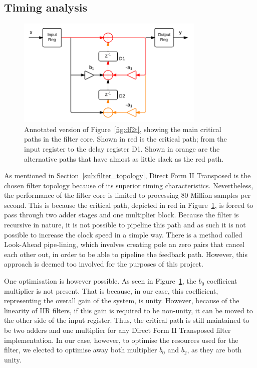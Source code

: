 \documentclass[]{article}
\begin{document}
\subsection{Timing analysis} %
\label{sub:timing_analysis}

\begin{figure}[tbp]
	\begin{center}
		\includegraphics[width = 0.8\textwidth]{DirectFormIITransposedCritpath.pdf}
	\end{center}
	\caption{Annotated version of Figure~\ref{fig:df2t}, showing the main critical paths in the filter core. Shown in red is the critical path; from the input register to the delay register D1. Shown in orange are the alternative paths that have almost as little slack as the red path.}
	\label{fig:df2tCritpath}
\end{figure}

As mentioned in Section~\ref{sub:filter_topology}, Direct Form II Transposed is the chosen filter topology because of its superior timing characteristics. Nevertheless, the performance of the filter core is limited to processing 80 Million samples per second.
This is because the critical path, depicted in red in Figure~\ref{fig:df2tCritpath}, is forced to pass through two adder stages and one multiplier block.
Because the filter is recursive in nature, it is not possible to pipeline this path and as such it is not possible to increase the clock speed in a simple way. There is a method called Look-Ahead pipe-lining, which involves creating pole an zero pairs that cancel each other out, in order to be able to pipeline the feedback path.
However, this approach is deemed too involved for the purposes of this project.

One optimisation is however possible. As seen in Figure~\ref{fig:df2tCritpath}, the $b_0$ coefficient multiplier is not present. That is because, in our case, this coefficient, representing the overall gain of the system, is unity.
However, because of the linearity of IIR filters, if this gain is required to be non-unity, it can be moved to the other side of the input register.
Thus, the critical path is still maintained to be two adders and one multiplier for any Direct Form II Transposed filter implementation.
In our case, however, to optimise the resources used for the filter, we elected to optimise away both multiplier $b_0$ and $b_2$, as they are both unity.
\end{document}
